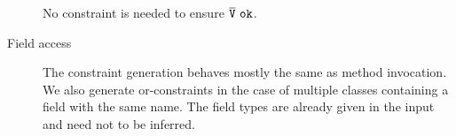 \begin{description}
No constraint is needed to ensure $\ol{V}\ \texttt{ok}$.

\item[Field access]
The constraint generation behaves mostly the same as method invocation.
We also generate or-constraints in the case of multiple classes containing a field with the same name.
The field types are already given in the input and need not to be inferred.


\end{description}
